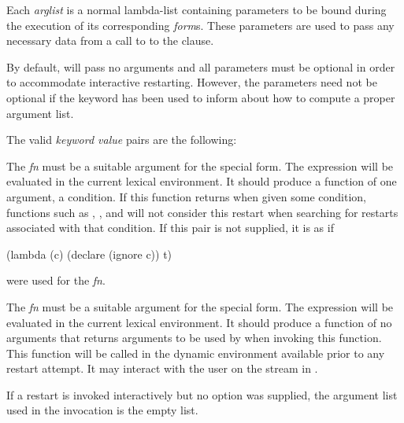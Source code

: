 \begin{defmac}
  Each {\it arglist} is a normal lambda-list containing parameters
  to be bound during the execution of 
  its corresponding {\it form\/}s. These parameters are used to pass any necessary 
  data from a call to  to the  clause.

  By default,  will pass no arguments and
  all parameters must be optional in order to accommodate interactive
  restarting. However, the parameters need not be optional if the
   keyword has been used to inform 
  about how to compute a proper argument list.

  The valid {\it keyword value} pairs are the following:
\begin{flushdesc}
\item[\cd{:test {\it fn}}]

    The {\it fn} must be a suitable argument for the  special form. The
    expression  will be evaluated in the current lexical
    environment. It should produce a function of one argument, a condition.
    If this function returns  when given some condition, functions such as
, , and 
will not consider this restart when searching for restarts associated with
that condition.  If this pair is not supplied, it is as if
\begin{lisp}
(lambda (c) (declare (ignore c)) t)
\end{lisp}
were used for the {\it fn}.

\item[\cd{:interactive {\it fn}}]

    The {\it fn} must be a suitable argument for the  special form. The
    expression  will be evaluated in the current lexical
    environment. It should produce a function of no arguments that 
    returns arguments to be used by  when
    invoking this function. This function will be called in the dynamic
    environment available prior to any restart attempt. It may interact with the user
    on the stream in .

    If a restart is invoked interactively but no  option
    was supplied, the argument list used in the invocation is the empty
    list.

\item[\cd{:report {\it exp}}]


\end{flushdesc}
\end{defmac}
